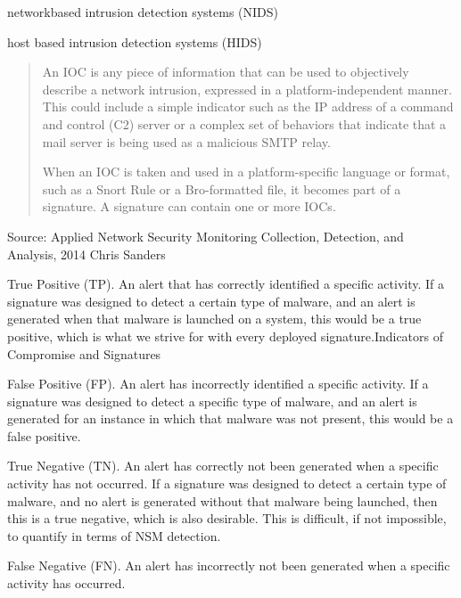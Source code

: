 \documentclass[Screen16to9,17pt]{foils}
\begin{document}

\begin{list2}
\item networkbased intrusion detection systems (NIDS)
\item host based intrusion detection systems (HIDS)
\end{list2}


\begin{quote}
An IOC is any piece of information that can be used to objectively describe a
network intrusion, expressed in a platform-independent manner. This could include a simple indicator such as the IP address of a command and control (C2) server or a complex set of behaviors that indicate that a mail server is being used as a malicious SMTP relay.

When an IOC is taken and used in a platform-specific language or format, such as a Snort Rule or a Bro-formatted file, it becomes part of a signature. A signature can contain one or more IOCs.
\end{quote}

Source: Applied Network Security Monitoring Collection, Detection, and Analysis, 2014 Chris Sanders


\begin{list2}
\item True Positive (TP). An alert that has correctly identified a specific activity. If a signature was designed to detect a certain type of malware, and an alert is generated when that malware is launched on a system, this would be a true positive, which is what we strive for with every deployed signature.Indicators of Compromise and Signatures
\item False Positive (FP). An alert has incorrectly identified a specific activity. If a signature was designed to detect a specific type of malware, and an alert is generated for an instance in which that malware was not present, this would be a false positive.
\item True Negative (TN). An alert has correctly not been generated when a specific activity has not occurred. If a signature was designed to detect a certain type of malware, and no alert is generated without that malware being launched, then this is a true negative, which is also desirable. This is difficult, if not impossible, to quantify in terms of NSM detection.
\item False Negative (FN). An alert has incorrectly not been generated when a specific activity has occurred.
\end{list2}
\end{document}
